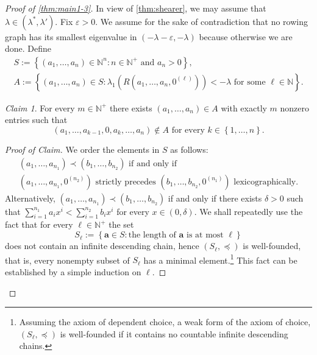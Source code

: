 \documentclass[11pt]{article}
\theoremstyle{definition}
\theoremstyle{remark}
\newtheorem*{claim*}{Claim}
\newenvironment{claimproof}[1][Proof]{\begin{proof}[#1]\renewcommand*{\qedsymbol}{\(\diamondsuit\)}}{\end{proof}}
\newcommand{\dset}[2]{\left\{{#1}\colon{#2}\right\}}
\newcommand{\sset}[1]{\left\{{#1}\right\}}
\newcommand{\eps}{\varepsilon}
\newcommand{\la}{\lambda}
\newcommand{\N}{\mathbb{N}}
\newcommand{\ba}{\bm{a}}
\begin{document}
\begin{proof}[Proof of \cref{thm:main1-3}]
    In view of \cref{thm:shearer}, we may assume that $\la \in (\la^*, \la')$. Fix $\eps > 0$. We assume for the sake of contradiction that no rowing graph has its smallest eigenvalue in $(-\la - \eps, -\la)$ because otherwise we are done. Define
    \begin{gather*}
        S := \dset{(a_1, \dots, a_n) \in \N^n}{n \in \N^+ \text{ and } a_n > 0}, \\
        A := \dset{(a_1, \dots, a_n) \in S}{\la_1(R(a_1, \dots, a_n, 0^{(\ell)})) < -\la \text{ for some }\ell \in \N}.
    \end{gather*}
    
    \begin{claim*}
        For every $m \in \N^+$ there exists $(a_1, \dots, a_n) \in A$ with exactly $m$ nonzero entries such that
        \begin{equation} \label{eqn:main1-3-claim}
            (a_1, \dots, a_{k-1}, 0, a_k, \dots, a_n) \not\in A\text{ for every }k \in \sset{1, \dots, n}.
        \end{equation}
    \end{claim*}

    \begin{claimproof}[Proof of Claim]
        We order the elements in $S$ as follows:
        \begin{multline*}
            (a_1, \dots, a_{n_1}) \prec (b_1, \dots, b_{n_2}) \text{ if and only if}\\
            (a_1, \dots, a_{n_1}, 0^{(n_2)}) \text{ strictly precedes } (b_1, \dots, b_{n_2}, 0^{(n_1)}) \text{ lexicographically}.
        \end{multline*}
        Alternatively, $(a_1, \dots, a_{n_1}) \prec (b_1, \dots, b_{n_2})$ if and only if there exists $\delta > 0$ such that $\sum_{i=1}^{n_1} a_ix^i < \sum_{i=1}^{n_2} b_ix^i$ for every $x \in (0, \delta)$. We shall repeatedly use the fact that for every $\ell \in \N^+$ the set
        \[
            S_\ell := \dset{\ba \in S}{\text{the length of }\ba \text{ is at most }\ell}
        \]
        does not contain an infinite descending chain, hence $(S_\ell, \preceq)$ is well-founded, that is, every nonempty subset of $S_\ell$ has a minimal element.\footnote{Assuming the axiom of dependent choice, a weak form of the axiom of choice, $(S_\ell, \preceq)$ is well-founded if it contains no countable infinite descending chains.} This fact can be established by a simple induction on $\ell$.
        

\end{claimproof}
\end{proof}
\end{document}

